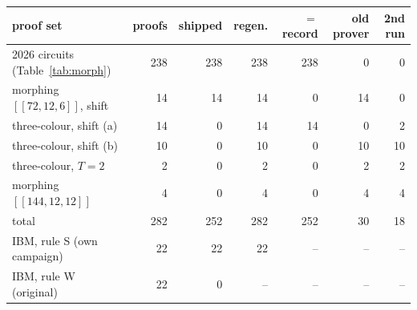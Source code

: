 \begin{tabular}{@{}lrrrrrr@{}}
\toprule
proof set & proofs & shipped & regen. & $=$ record & old prover & 2nd run \\
\midrule
2026 circuits (Table~\ref{tab:morph}) & 238 & 238 & 238 & 238 & 0 & 0 \\
morphing $[[72,12,6]]$, shift & 14 & 14 & 14 & 0 & 14 & 0 \\
three-colour, shift (a) & 14 & 0 & 14 & 14 & 0 & 2 \\
three-colour, shift (b) & 10 & 0 & 10 & 0 & 10 & 10 \\
three-colour, $T=2$ & 2 & 0 & 2 & 0 & 2 & 2 \\
morphing $[[144,12,12]]$ & 4 & 0 & 4 & 0 & 4 & 4 \\
total & 282 & 252 & 282 & 252 & 30 & 18 \\
\midrule
IBM, rule S (own campaign) & 22 & 22 & 22 & -- & -- & -- \\
IBM, rule W (original) & 22 & 0 & -- & -- & -- & -- \\
\bottomrule
\end{tabular}
